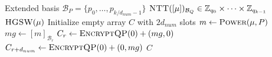 \begin{algorithm}
\caption{Hybrid-RGSW Encryption}
\label{alg:hybrid:encrypt}
\begin{algorithmic}[1]
\Require Extended basis $\mathcal{B}_{P} = \{ p_0, \dots, p_{k/d_{num} - 1} \}$
\Require $\Call{NTT}{[\mu]}_{\mathcal{B}_Q} \in \mathbb{Z}_{q_0} \times \dots \times  \mathbb{Z}_{q_{k-1}}$
\Ensure $\Call{HGSW}{\mu}$
\State Initialize empty array $C$ with $2d_{num}$ slots
\State $m \gets \Call{Power}{\mu, P}$
\For{$r \gets [0, d_{num})$ \textbf{in parallel}}
    \State $mg \gets [m]_{\mathcal{B}_r}$
    \State $C_r \gets \Call{EncryptQP}{0} + (mg, 0) $
    \State $C_{r + d_{num}} \gets \Call{EncryptQP}{0} + (0, mg)$
\EndFor
\State \Return $C$
\end{algorithmic}
\end{algorithm}